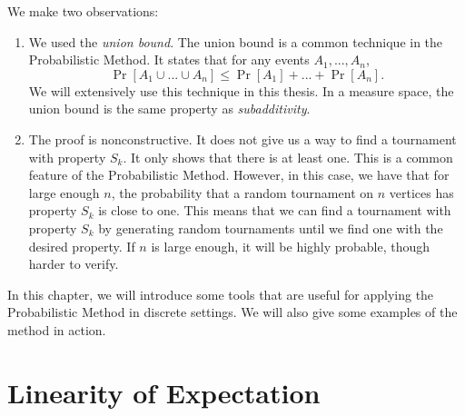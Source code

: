 We make two observations: 
\begin{enumerate}
    \item We used the \textit{union bound}. The union bound is a common technique in the Probabilistic Method. It states that for any events $A_1, ..., A_n$,
    \[\Pr[A_1 \cup ... \cup A_n] \leq \Pr[A_1] + ... + \Pr[A_n].\]
    We will extensively use this technique in this thesis. In a measure space, the union bound is the same property as \textit{subadditivity}. \par
    \item The proof is nonconstructive. It does not give us a way to find a tournament with property $S_k$. It only shows that there is at least one. This is a common feature of the Probabilistic Method. However, in this case, we have that for large enough $n$, the probability that a random tournament on $n$ vertices has property $S_k$ is close to one. This means that we can find a tournament with property $S_k$ by generating random tournaments until we find one with the desired property. If $n$ is large enough, it will be highly probable, though harder to verify. \par
\end{enumerate}
In this chapter, we will introduce some tools that are useful for applying the Probabilistic Method in discrete settings. We will also give some examples of the method in action. \par

\section{Linearity of Expectation}\label{sec:probmet:linearity}

